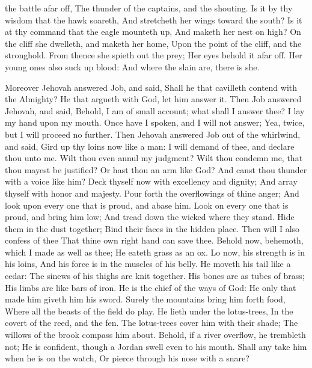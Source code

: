 the battle afar off, The thunder of the captains, and the shouting.  Is it by thy wisdom that the hawk soareth, And stretcheth her wings toward the south?  Is it at thy command that the eagle mounteth up, And maketh her nest on high?  On the cliff she dwelleth, and maketh her home, Upon the point of the cliff, and the stronghold.  From thence she spieth out the prey; Her eyes behold it afar off.  Her young ones also suck up blood: And where the slain are, there is she. 

Moreover Jehovah answered Job, and said,  Shall he that cavilleth contend with the Almighty? He that argueth with God, let him answer it.  Then Job answered Jehovah, and said,  Behold, I am of small account; what shall I answer thee? I lay my hand upon my mouth.  Once have I spoken, and I will not answer; Yea, twice, but I will proceed no further.  Then Jehovah answered Job out of the whirlwind, and said,  Gird up thy loins now like a man: I will demand of thee, and declare thou unto me.  Wilt thou even annul my judgment? Wilt thou condemn me, that thou mayest be justified?  Or hast thou an arm like God? And canst thou thunder with a voice like him?  Deck thyself now with excellency and dignity; And array thyself with honor and majesty.  Pour forth the overflowings of thine anger; And look upon every one that is proud, and abase him.  Look on every one that is proud, and bring him low; And tread down the wicked where they stand.  Hide them in the dust together; Bind their faces in the hidden place.  Then will I also confess of thee That thine own right hand can save thee.  Behold now, behemoth, which I made as well as thee; He eateth grass as an ox.  Lo now, his strength is in his loins, And his force is in the muscles of his belly.  He moveth his tail like a cedar: The sinews of his thighs are knit together.  His bones are as tubes of brass; His limbs are like bars of iron.  He is the chief of the ways of God: He only that made him giveth him his sword.  Surely the mountains bring him forth food, Where all the beasts of the field do play.  He lieth under the lotus-trees, In the covert of the reed, and the fen.  The lotus-trees cover him with their shade; The willows of the brook compass him about.  Behold, if a river overflow, he trembleth not; He is confident, though a Jordan swell even to his mouth.  Shall any take him when he is on the watch, Or pierce through his nose with a snare? 

